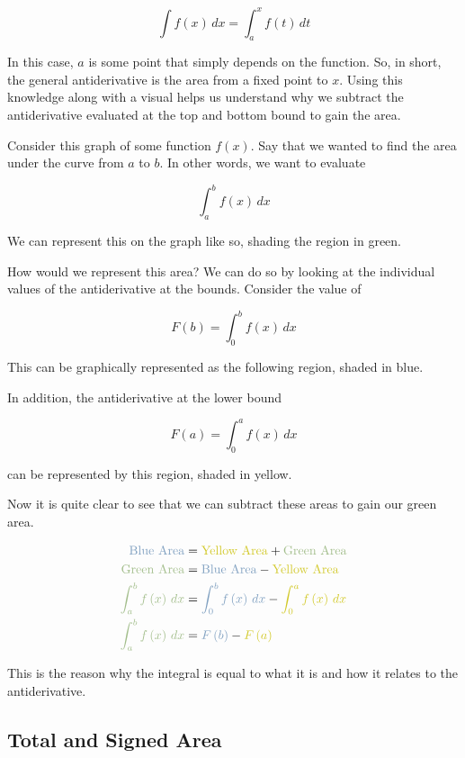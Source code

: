 \[
    \int f \left( x \right) \, dx = \int_{ a }^{ x } f \left( t \right) \, dt
\]

In this case, \( a \) is some point that simply depends on the function. So, in short, the general antiderivative is the area from a fixed point to \( x \). Using this knowledge along with a visual helps us understand why we subtract the antiderivative evaluated at the top and bottom bound to gain the area.

Consider this graph of some function \( f \left( x \right) \). Say that we wanted to find the area under the curve from \( a \) to \( b \). In other words, we want to evaluate

\[
    \int_{ a }^{ b } f \left( x \right) \, dx
\]

We can represent this on the graph like so, shading the region in green.

\begin{figure}[H]
    \centering
    
\end{figure}

How would we represent this area? We can do so by looking at the individual values of the antiderivative at the bounds. Consider the value of

\[
    F \left( b \right) = \int_{ 0 }^{ b } f \left( x \right) \, dx
\]

This can be graphically represented as the following region, shaded in blue.

\begin{figure}[H]
    \centering
    
\end{figure}

In addition, the antiderivative at the lower bound

\[
    F \left( a \right) = \int_{ 0 }^{ a } f \left( x \right) \, dx
\]

can be represented by this region, shaded in yellow.

\begin{figure}[H]
    \centering
    
\end{figure}

Now it is quite clear to see that we can subtract these areas to gain our green area.

\begin{align*}
    \textcolor{blue}{\text{Blue Area}} &= \textcolor{notationfg}{\text{Yellow Area}} + \textcolor{green}{\text{Green Area}} \\
    \textcolor{green}{\text{Green Area}} &= \textcolor{blue}{\text{Blue Area}} - \textcolor{notationfg}{\text{Yellow Area}} \\
    \textcolor{green}{\int_{ a }^{ b } f \left( x \right) \, dx} &= \textcolor{blue}{\int_{ 0 }^{ b } f \left( x \right) \, dx} - \textcolor{notationfg}{\int_{ 0 }^{ a } f \left( x \right) \, dx} \\
    \textcolor{green}{\int_{ a }^{ b } f \left( x \right) \, dx} &= \textcolor{blue}{F \left( b \right)} - \textcolor{notationfg}{F \left( a \right)}
\end{align*}

This is the reason why the integral is equal to what it is and how it relates to the antiderivative.

\subsection{Total and Signed Area}


